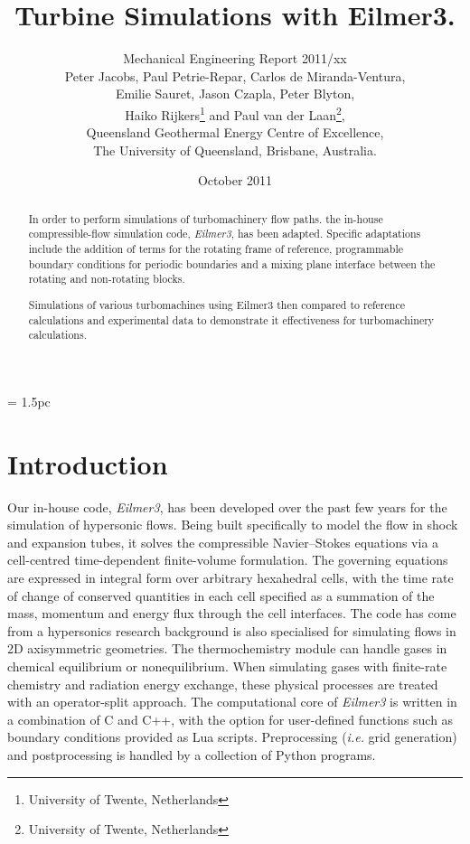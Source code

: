 \documentclass[12pt,a4paper,twoside]{article}
\title{
    Turbine Simulations with Eilmer3.
}
\author{
    Mechanical Engineering Report 2011/xx\\
    Peter Jacobs, Paul Petrie-Repar, Carlos de Miranda-Ventura,\\
    Emilie Sauret, Jason Czapla, Peter Blyton,\\
    Haiko Rijkers\thanks{University of Twente, Netherlands} and 
    Paul van der Laan\thanks{University of Twente, Netherlands},\\
    Queensland Geothermal Energy Centre of Excellence,\\
    The University of Queensland, Brisbane, Australia.
}
\date{October 2011}
\begin{document}
\maketitle

\begin{abstract}
In order to perform simulations of turbomachinery flow paths.
the in-house compressible-flow simulation code, \textit{Eilmer3}, 
has been adapted.
Specific adaptations include the addition of terms for the rotating frame of reference, 
programmable boundary conditions for periodic boundaries 
and a mixing plane interface between the rotating and non-rotating blocks.

\medskip
Simulations of various turbomachines using Eilmer3 then compared to 
reference calculations and experimental data to demonstrate it effectiveness
for turbomachinery calculations.
\end{abstract}

\cleardoublepage
\tableofcontents

\cleardoublepage
\baselineskip = 1.5pc

\section{Introduction}
\label{intro-sec}
%
Our in-house code, \textit{Eilmer3}, has been developed over the past few years 
for the simulation of hypersonic flows.
Being built specifically to model the flow in shock and expansion tubes,
it solves the compressible Navier--Stokes equations via a cell-centred time-dependent finite-volume formulation.
The governing equations are expressed in integral form over arbitrary hexahedral cells, 
with the time rate of change of conserved quantities in each cell specified as a summation of 
the mass, momentum and energy flux through the cell interfaces.  
The code has come from a hypersonics research background is also specialised 
for simulating flows in 2D axisymmetric geometries.
The thermochemistry module can handle gases in chemical equilibrium or nonequilibrium.
When simulating gases with finite-rate chemistry and radiation energy exchange, 
these physical processes are treated with an operator-split approach. 
The computational core of \textit{Eilmer3} is written in a combination of C and C++, 
with the option for user-defined functions such as boundary conditions provided as Lua scripts.
Preprocessing (\textit{i.e.} grid generation) and postprocessing is handled by a collection of Python programs.
\end{document}
